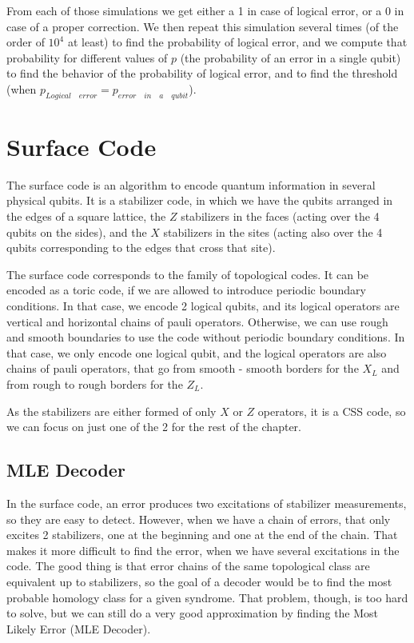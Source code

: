 \documentclass[a4paper,12pt]{article}
\begin{document}
From each of those simulations we get either a 1 in case of logical error, or a 0 in case of a proper correction. We then repeat this simulation several times (of the order of $10^4$ at least) to find the probability of logical error, and we compute that probability for different values of $p$ (the probability of an error in a single qubit) to find the behavior of the probability of logical error, and to find the threshold (when $p_{Logical\quad error}=p_{error\quad in \quad a \quad qubit}$).
\newpage

\section{Surface Code}

The surface code is an algorithm to encode quantum information in several physical qubits. It is a stabilizer code, in which we have the qubits arranged in the edges of a square lattice, the $Z$ stabilizers in the faces (acting over the 4 qubits on the sides), and the $X$ stabilizers in the sites (acting also over the 4 qubits corresponding to the edges that cross that site). 

The surface code corresponds to the family of topological codes. It can be encoded as a toric code, if we are allowed to introduce periodic boundary conditions. In that case, we encode 2 logical qubits, and its logical operators are vertical and horizontal chains of pauli operators. Otherwise, we can use rough and smooth boundaries to use the code without periodic boundary conditions.  In that case, we only encode one logical qubit, and the logical operators are also chains of pauli operators, that go from smooth - smooth borders for the $X_L$ and from rough to rough borders for the $Z_L$.

As the stabilizers are either formed of only $X$ or $Z$ operators, it is a CSS code, so we can focus on just one of the 2 for the rest of the chapter.

\subsection{MLE Decoder}

In the surface code, an error produces two excitations of stabilizer measurements, so they are easy to detect. However, when we have a chain of errors, that only excites 2 stabilizers, one at the beginning and one at the end of the chain. That makes it more difficult to find the error, when we have several excitations in the code.  The good thing is that error chains of the same topological class are equivalent up to stabilizers, so the goal of a decoder would be to find the most probable homology class for a given syndrome. That problem, though, is too hard to solve, but we can still do a very good approximation by finding the Most Likely Error (MLE Decoder).
\end{document}
